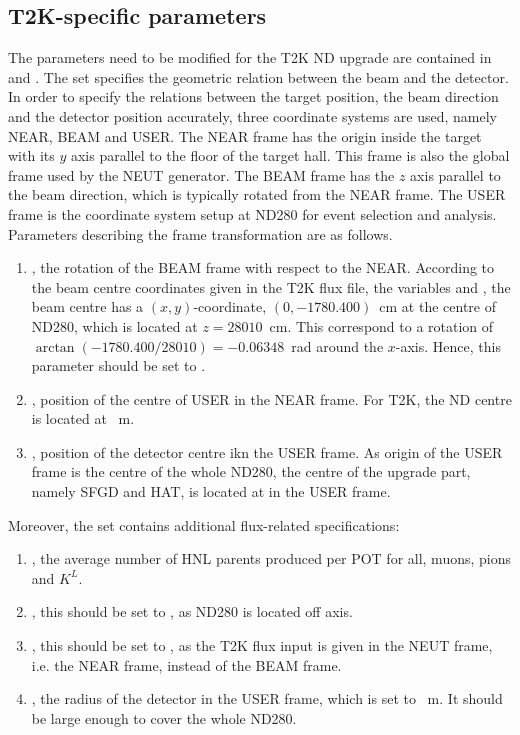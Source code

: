     \subsection{T2K-specific parameters}
    The parameters need to be modified for the T2K ND upgrade are contained in  and .
    The  set specifies the geometric relation between the beam and the detector. 
    In order to specify the relations between the target position, the beam direction and the detector position accurately, three coordinate systems are used, namely NEAR, BEAM and USER.
    The NEAR frame has the origin inside the target with its $y$ axis parallel to the floor of the target hall.
    This frame is also the global frame used by the NEUT generator.
    The BEAM frame has the $z$ axis parallel to the beam direction, which is typically rotated from the NEAR frame.
    The USER frame is the coordinate system setup at ND280 for event selection and analysis.
    Parameters describing the frame transformation are as follows.
    \begin{enumerate}
        \item {}, the rotation of the BEAM frame with respect to the NEAR. 
        According to the beam centre coordinates given in the T2K flux file, the variables  and , the beam centre has a $(x,y)$-coordinate, $(0,-1780.400)$~cm at the centre of ND280, which is located at $z=28010$~cm. 
        This correspond to a rotation of $\arctan(-1780.400/28010)=-0.06348$~rad around the $x$-axis.
        Hence, this parameter should be set to . 
        \item {}, position of the centre of USER in the NEAR frame.
        For T2K, the ND centre is located at ~m.
        \item {}, position of the detector centre ikn the USER frame. 
        As origin of the USER frame is the centre of the whole ND280, the centre of the upgrade part, namely SFGD and HAT, is located at  in the USER frame.
    \end{enumerate}   

    Moreover, the  set contains additional flux-related specifications:
    \begin{enumerate}
        \item {}, the average number of HNL parents produced per POT for all, muons, pions and $K^{L}$.
        \item {}, this should be set to , as ND280 is located off axis.
        \item {}, this should be set to , as the T2K flux input is given in the NEUT frame, i.e. the NEAR frame, instead of the BEAM frame.
        \item {}, the radius of the detector in the USER frame, which is set to ~m. 
        It should be large enough to cover the whole ND280.
    \end{enumerate}



